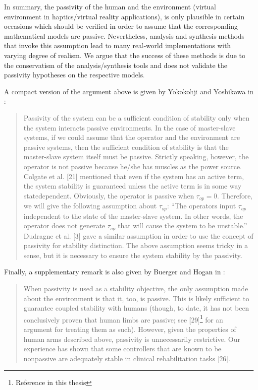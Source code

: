 In summary, the passivity of the human and the environment (virtual environment in haptics/virtual reality applications), is 
only plausible in certain occasions which should be verified in order to assume that the corresponding mathematical models 
are passive. Nevertheless, analysis and synthesis methods that invoke this assumption lead to many real-world implementations 
with varying degree of realism. We argue that the success of these methods is due to the conservatism of the analysis/synthesis tools
and does not validate the passivity hypotheses on the respective models.

A compact version of the argument above is given by Yokokohji and Yoshikawa in \cite{yokokohjiyoshikawa}: 
\begin{quote}
Passivity of the system can be a
sufficient condition of stability only when the system interacts
passive environments. In the case of master-slave systems, if
we could assume that the operator and the environment are
passive systems, then the sufficient condition of stability is
that the master-slave system itself must be passive. Strictly
speaking, however, the operator is not passive because he/she
has muscles as the power source. Colgate et al. [21] mentioned
that even if the system has an active term, the system stability
is guaranteed unless the active term is in some way statedependent.
Obviously, the operator is passive when $\tau_{op}= 0$.
Therefore, we will give the following assumption about $\tau_{op}$:
``The operators input $\tau_{op}$ independent to the state of the
master-slave system. In other words, the operator does not
generate $\tau_{op}$ that will cause the system to be unstable.''
Dudragne et al. [3] gave a similar assumption in order to use
the concept of passivity for stability distinction. The above
assumption seems tricky in a sense, but it is necessary to ensure
the system stability by the passivity.
\end{quote}

\noindent Finally, a supplementary remark is also given by Buerger and Hogan in \cite{buergerhogan1}: 
\begin{quote}
When passivity is used as a stability objective, the only assumption
made about the environment is that it, too, is passive.
This is likely sufficient to guarantee coupled stability with humans
(though, to date, it has not been conclusively proven that
human limbs are passive; see [29]\footnote{Reference \cite{hogan89} in this thesis} for an argument for treating
them as such). However, given the properties of human arms
described above, passivity is unnecessarily restrictive. Our experience
has shown that some controllers that are known to be
nonpassive are adequately stable in clinical rehabilitation tasks [26].
\end{quote}


